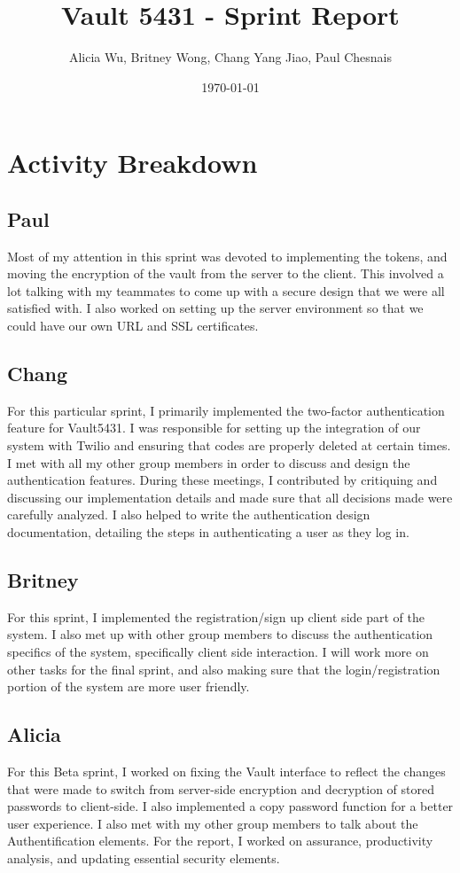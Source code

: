 \documentclass{article}
\title{Vault 5431 - Sprint Report}
\author{Alicia Wu, Britney Wong, Chang Yang Jiao, Paul Chesnais}
\date{\today}
\begin{document}
\maketitle
\thispagestyle{empty}

\section{Activity Breakdown}
\subsection{Paul}
\par Most of my attention in this sprint was devoted to implementing the tokens, and moving the encryption of the vault from the server to the client. This involved a lot talking with my teammates to come up with a secure design that we were all satisfied with. I also worked on setting up the server environment so that we could have our own URL and SSL certificates.

\subsection{Chang}
\par For this particular sprint, I primarily implemented the two-factor authentication feature for Vault5431. I was responsible for setting up the integration of our system with Twilio and ensuring that codes are properly deleted at certain times. I met with all my other group members in order to discuss and design the authentication features. During these meetings, I contributed by critiquing and discussing our implementation details and made sure that all decisions made were carefully analyzed. I also helped to write the authentication design documentation, detailing the steps in authenticating a user as they log in.

\subsection{Britney}
\par For this sprint, I implemented the registration/sign up client side part of the system. I also met up with other group members to discuss the authentication specifics of the system, specifically client side interaction.  I will work more on other tasks for the final sprint, and also making sure that the login/registration portion of the system are more user friendly.

\subsection{Alicia}
\par For this Beta sprint, I worked on fixing the Vault interface to reflect the changes that were made to switch from server-side encryption and decryption of stored passwords to client-side. I also implemented a copy password function for a better user experience. I also met with my other group members to talk about the Authentification elements. For the report, I worked on assurance, productivity analysis, and updating essential security elements.
\end{document}
